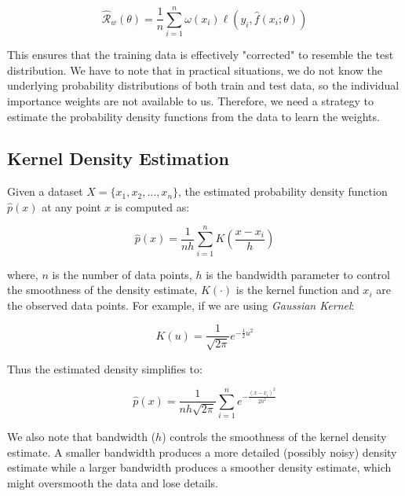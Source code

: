 \begin{equation}
    \hat{\mathcal{R}}_{w}(\theta) = \frac{1}{n}\sum_{i=1}^{n} \omega(x_i) \ell(y_i, \hat{f}(x_i; \theta))
    \label{eqn:3.3}
\end{equation}

This ensures that the training data is effectively "corrected" to resemble the test distribution. We have to note that in practical situations, we do not know the underlying probability distributions of both train and test data, so the individual importance weights are not available to us. Therefore, we need a strategy to estimate the probability density functions from the data to learn the weights. 

\subsection{Kernel Density Estimation}

Given a dataset $X = \{ x_1, x_2, \ldots, x_n \}$, the estimated probability density function $\hat{p}(x)$ at any point $x$ is computed as:

\begin{equation}
    \hat{p}(x) = \frac{1}{nh} \sum_{i=1}^n K \left( \frac{x - x_i}{h} \right) 
    \label{eqn:3.4}
\end{equation}

where, $n$ is the number of data points, $h$ is the bandwidth parameter to control the smoothness of the density estimate, $K(\cdot)$ is the kernel function and $x_i$ are the observed data points. For example, if we are using \emph{Gaussian Kernel}:

\begin{equation}
    K(u) = \frac{1}{\sqrt{2\pi}} e^{-\frac{1}{2}u^2} 
    \label{eqn:3.5}
\end{equation}

Thus the estimated density simplifies to:

\begin{equation}
    \hat{p}(x) = \frac{1}{nh\sqrt{2\pi}} \sum_{i=1}^n e^{-\frac{(x - x_i)^2}{2h^2}} 
    \label{eqn:3.6}
\end{equation}

We also note that bandwidth ($h$) controls the smoothness of the kernel density estimate. A smaller bandwidth produces a more detailed (possibly noisy) density estimate while a larger bandwidth produces a smoother density estimate, which might oversmooth the data and lose details.\\

